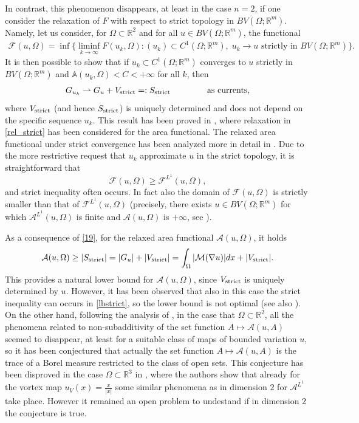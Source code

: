 \documentclass[a4paper,11pt]{article}
\numberwithin{equation}{section}
\newcommand{\Om}{\Omega}
\newcommand{\R}{\mathbb{R}}
\begin{document}
In contrast, this phenomenon disappears, at least in the case $n=2$, if one consider the relaxation of $F$ with respect to strict topology in $BV(\Om;\R^m)$. Namely, let us consider, for $\Om\subset\R^2$ and for all $u\in BV(\Om;\R^m)$, the functional 
\begin{align}\label{rel_strict}
\mathcal F(u,\Om)=\inf\{\liminf_{k\rightarrow\infty}F(u_k,\Om):(u_k)\subset C^1(\Om;\R^m),\;u_k\rightarrow u\text{ strictly in  }BV(\Om;\R^m)\}.
\end{align}
It is then possible to show that if $u_k\subset C^1(\Om;\R^m)$ converges to $u$ strictly in $BV(\Om;\R^m)$ and $\mathbb A(u_k,\Om)<C<+\infty$ for all $k$, then
\begin{align}\label{19}
G_{u_k}\rightharpoonup G_u+V_{{\rm strict}}=:S_{{\rm strict}} \qquad \qquad \text{ as currents,} 
\end{align}
where $V_{{\rm strict}}$ (and hence $S_{{\rm strict}}$) is uniquely determined and does not depend on the specific sequence $u_k$. This result has been proved in \cite{Mucci}, where relaxation in \eqref{rel_strict} has been considered for the area functional. The relaxed area functional under strict convergence has been analyzed more in detail in \cite{BCS,BCS2,C,CM}. 
 Due to the more restrictive request that $u_k$ approximate $u$ in the strict topology, it is straightforward that 
 $$\mathcal F(u,\Om)\geq \mathcal F^{L^1}(u,\Om),$$
and strict inequality often occurs. In fact also the domain of $\mathcal F(u,\Om)$ is strictly smaller than that of $\mathcal F^{L^1}(u,\Om)$ (precisely, there exists $u\in BV(\Om;\R^m)$ for which $\mathcal A^{L^1}(u,\Om)$ is finite and $\mathcal A(u,\Om)$ is $+\infty$, see \cite{BCS2}). 

As a consequence of \eqref{19}, for the relaxed area functional $\mathcal A(u,\Om)$, it holds
\begin{align}\label{lbstrict}
\mathcal A(u,\Om)\geq |S_{{\rm strict}}|=|G_u|+|V_{{\rm strict}}|=\int_\Om|\mathcal M(\nabla u)|dx+|V_{{\rm strict}}|.
\end{align}
This provides a natural lower bound for $\mathcal A(u,\Om)$, since $V_{{\rm strict}}$ is uniquely determined by $u$. However, it has been observed \cite{Mucci}
that also in this case the strict inequality can occurs in \eqref{lbstrict}, so the lower bound is not optimal (see also \cite{BCS,BCS2,C}). On the other hand, following the analysis of \cite{BCS,BCS2,C}, in the case that $\Om\subset\R^2$, all the phenomena related to non-subadditivity of the set function $A\mapsto \mathcal A(u,A)$ seemed to disappear, at least for a suitable class of maps of bounded variation $u$, so it has been conjectured that actually the set function $A\mapsto \mathcal A(u,A)$ is the trace of a Borel measure restricted to the class of open sets. This conjecture has been disproved in the case $\Om\subset\R^3$ in \cite{CM}, where the authors show that already for the vortex map $u_V(x)=\frac{x}{|x|}$ some similar phenomena as in dimension $2$  for $\mathcal A^{L^1}$ take place. However it remained an open problem to undestand if in dimension $2$ the conjecture is true.
\end{document}
